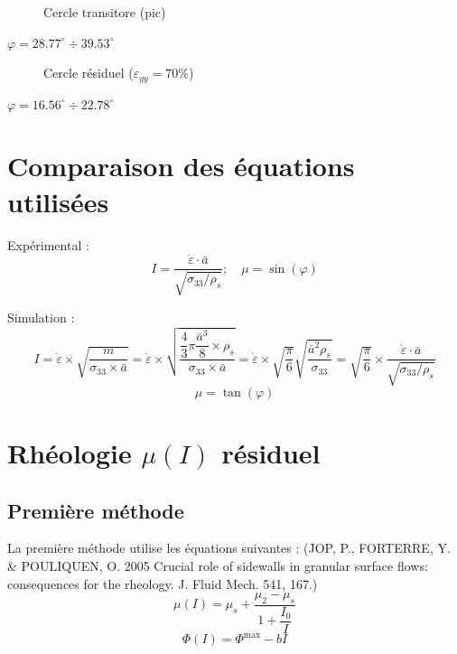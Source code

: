 \documentclass[a4paper,12pt]{report}
\begin{document}
                                \begin{figure}
                                  
                                    \caption{Cercle transitore (pic)}
                                \end{figure}

                                    $\varphi = 28.77^\circ \div 39.53^\circ $


                                \begin{figure}
                                    
                                    \caption{Cercle résiduel ($\varepsilon_{yy} = 70\%$)}
                                \end{figure}
                                    $\varphi = 16.56^\circ \div 22.78^\circ $
                                    
\section{Comparaison des équations utilisées}

Expérimental : 
\[
I =  \dfrac{\dot{\varepsilon} \cdot \bar{a}}{\sqrt{\sigma_{33}/\rho_s}}; \quad \mu = \sin(\varphi)
\]

Simulation : 
\[
I = \dot{\varepsilon} \times \sqrt {\dfrac{m}{\sigma_{33}\times \bar{a}}}  
= \dot{\varepsilon} \times \sqrt {\dfrac{\dfrac{4}{3} \pi \dfrac{\bar{a}^3}{8} \times \rho_s}{\sigma_{33}\times \bar{a}}} 
= \dot{\varepsilon} \times \sqrt{\dfrac{\pi}{6}} \sqrt {\dfrac{\bar{a}^2 \rho_s}{\sigma_{33}}} 
= \boxed{\sqrt{\dfrac{\pi}{6}}} \times \dfrac{\dot{\varepsilon} \cdot \bar{a}}{\sqrt{\sigma_{33}/\rho_s}}
\]
\[
\mu = \tan(\varphi)
\]

\section{Rhéologie $\mu(I)$ résiduel}

\subsection{Première méthode}

La première méthode utilise les équations suivantes : (JOP, P., FORTERRE, Y. & POULIQUEN, O. 2005 Crucial role of sidewalls in granular surface flows:
consequences for the rheology. J. Fluid Mech. 541, 167.)
\[
\mu(I) = \mu_s + \dfrac{\mu_2 - \mu_s}{1 + \dfrac{I_0}{I}}
\]
\[
\Phi(I) = \Phi^{\max} - bI
\]
\end{document}
